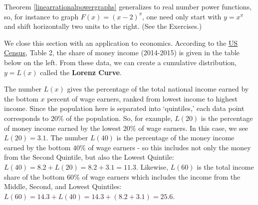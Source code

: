 \documentclass{ximera}
\begin{document}
\begin{center}

% 


\end{center}

Theorem \ref{linearrationalpowergraphs}  generalizes to real number power functions, so, for instance to graph $F(x) = (x-2)^{\pi}$, one need only start with $y = x^{\pi}$ and shift horizontally two units to the right.  (See the Exercises.)  

We close this section with an application to economics.  According to the \href{http://www.census.gov/library/publications/2016/demo/p60-256.html }{\underline{US Census}}, Table 2, the share of money income (2014-2015) is given in the table below on the left. From these data, we can create a cumulative distribution, $y = L(x)$ called the \textbf{Lorenz Curve}.   

The number $L(x)$ gives the percentage of the total national income earned by the bottom $x$ percent of wage earners, ranked from lowest income to highest income.  Since the population here is separated into `quintiles,' each data point corresponds to $20 \%$ of the population.  So, for example, $L(20)$ is the percentage of money income earned by the lowest $20 \%$ of wage earners.  In this case, we see $L(20) = 3.1$.  The number  $L(40)$ is the percentage of the money income earned by the bottom $40 \%$ of wage earners - so this includes not only the money from the Second Quintile, but also the Lowest Quintile:  $L(40) = 8.2 + L(20) = 8.2 +  3.1 = 11.3$.  Likewise, $L(60)$ is the total income share of the bottom $60 \%$ of wage earners which includes the income from the Middle, Second, and Lowest Quintiles:  $L(60) = 14.3 + L(40) = 14.3 + (8.2+3.1) = 25.6$.  
\end{document}
